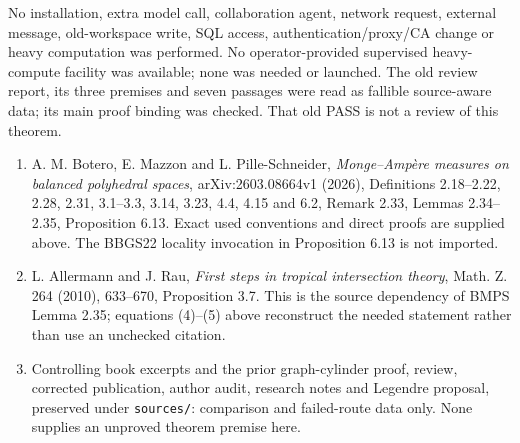 \documentclass[
  11pt,
]{article}
\providecommand{\tightlist}{%
  \setlength{\itemsep}{0pt}\setlength{\parskip}{0pt}}
\begin{document}
No installation, extra model call, collaboration agent, network request,
external message, old-workspace write, SQL access,
authentication/proxy/CA change or heavy computation was performed. No
operator-provided supervised heavy-compute facility was available; none
was needed or launched. The old review report, its three premises and
seven passages were read as fallible source-aware data; its main proof
binding was checked. That old PASS is not a review of this theorem.

\begin{enumerate}
\def\labelenumi{\arabic{enumi}.}
\tightlist
\item
  A. M. Botero, E. Mazzon and L. Pille-Schneider, \emph{Monge--Ampère
  measures on balanced polyhedral spaces}, arXiv:2603.08664v1 (2026),
  Definitions 2.18--2.22, 2.28, 2.31, 3.1--3.3, 3.14, 3.23, 4.4, 4.15
  and 6.2, Remark 2.33, Lemmas 2.34--2.35, Proposition 6.13. Exact used
  conventions and direct proofs are supplied above. The BBGS22 locality
  invocation in Proposition 6.13 is not imported.
\item
  L. Allermann and J. Rau, \emph{First steps in tropical intersection
  theory}, Math. Z. 264 (2010), 633--670, Proposition 3.7. This is the
  source dependency of BMPS Lemma 2.35; equations (4)--(5) above
  reconstruct the needed statement rather than use an unchecked
  citation.
\item
  Controlling book excerpts and the prior graph-cylinder proof, review,
  corrected publication, author audit, research notes and Legendre
  proposal, preserved under \texttt{sources/}: comparison and
  failed-route data only. None supplies an unproved theorem premise
  here.
\end{enumerate}
\end{document}
